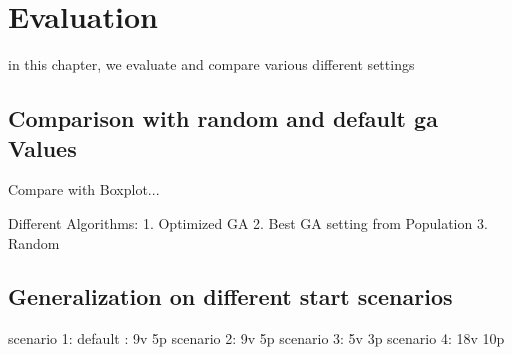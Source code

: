 \chapter{Evaluation}
\label{chap:evaluation}
in this chapter, we evaluate and compare various different settings



\section{Comparison with random and default ga Values}

Compare with Boxplot...

Different Algorithms:
1. Optimized GA
2. Best GA setting from Population
3. Random



\section{Generalization on different start scenarios}

scenario 1: default : 9v 5p
scenario 2: 9v 5p
scenario 3: 5v 3p
scenario 4: 18v 10p
